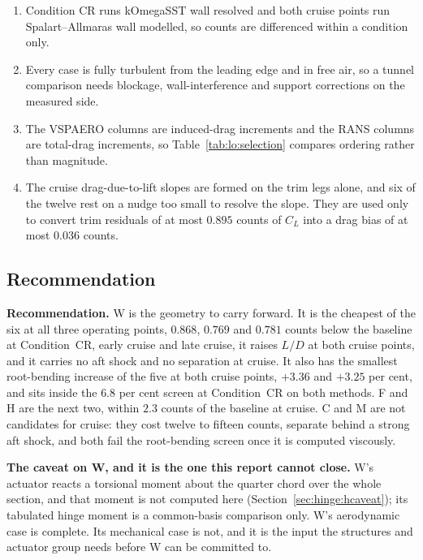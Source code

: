 \begin{enumerate}
camber difference is an order of magnitude smaller again, at most $0.0034$ per cent of chord.
Both wings are the same planform at the same twist, so this is a thickness-channel
difference, and the candidate-to-candidate comparison is taken between surfaces of the
corrected lineage throughout and does not cross it.
\item Condition CR runs kOmegaSST wall resolved and both cruise points run Spalart--Allmaras wall
modelled, so counts are differenced within a condition only.
\item Every case is fully turbulent from the leading edge and in free air, so a tunnel comparison
needs blockage, wall-interference and support corrections on the measured side.
\item The VSPAERO columns are induced-drag increments and the RANS columns are total-drag
increments, so Table~\ref{tab:lo:selection} compares ordering rather than magnitude.
\item The cruise drag-due-to-lift slopes are formed on the trim legs alone, and six of the twelve
rest on a nudge too small to resolve the slope. They are used only to convert trim residuals of
at most $0.895$ counts of $C_L$ into a drag bias of at most $0.036$ counts.
\end{enumerate}

\subsection{Recommendation}
\label{sec:perf:recommendation}

\textbf{Recommendation.} W is the geometry to carry forward. It is the cheapest of the six at all
three operating points, $0.868$, $0.769$ and $0.781$ counts below the baseline at Condition~CR,
early cruise and late cruise, it raises $L/D$ at both cruise points, and it carries no aft shock
and no separation at cruise. It also has the smallest root-bending increase of the five at both
cruise points, $+3.36$ and $+3.25$ per cent, and sits inside the $6.8$ per cent screen at
Condition~CR on both methods. F and H are the next two, within $2.3$ counts of the baseline at
cruise. C and M are not candidates for cruise: they cost twelve to fifteen counts, separate behind
a strong aft shock, and both fail the root-bending screen once it is computed viscously.

\textbf{The caveat on W, and it is the one this report cannot close.} W's actuator reacts a
torsional moment about the quarter chord over the whole section, and that moment is not computed
here (Section~\ref{sec:hinge:hcaveat}); its tabulated hinge moment is a common-basis comparison
only. W's aerodynamic case is complete. Its mechanical case is not, and it is the input the
structures and actuator group needs before W can be committed to.


